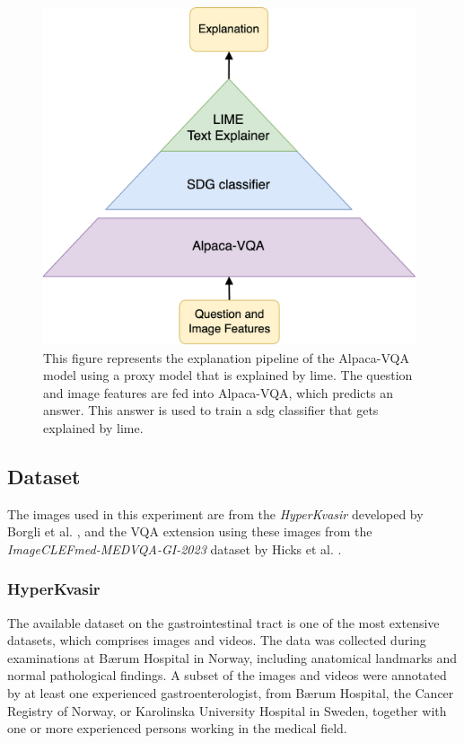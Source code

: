         \begin{figure}[htb]
            \centering
            \centerline{
            \includegraphics[width=11cm]
            {images/LIMEpyramide.png}}
            \caption{This figure represents the explanation pipeline of the Alpaca-VQA model using a proxy model that is explained by \gls{lime}. The question and image features are fed into Alpaca-VQA, which predicts an answer. This answer is used to train a \gls{sdg} classifier that gets explained by \gls{lime}.}
            \label{fig:LIMEpyramide}
        \end{figure}


        
        
        

    \subsection{Dataset}
        
        The images used in this experiment are from the \textit{HyperKvasir} developed by Borgli et al. \cite{borgliHyperKvasirComprehensiveMulticlass2020}, and the VQA extension using these images from the \textit{ImageCLEFmed-MEDVQA-GI-2023} dataset by Hicks et al. \cite{hicksImageCLEFmedMEDVQAGI20232023, hicksImageCLEFmedMEDVQAGIImageCLEF}. 
        
        \subsubsection{HyperKvasir}
        The available dataset on the gastrointestinal tract is one of the most extensive datasets, which comprises images and videos. The data was collected during examinations at Bærum Hospital in Norway, including anatomical landmarks and normal pathological findings.
        A subset of the images and videos were annotated by at least one experienced gastroenterologist, from Bærum Hospital, the Cancer Registry of Norway, or Karolinska University Hospital in Sweden, together with one or more experienced persons working in the medical field.  
        
